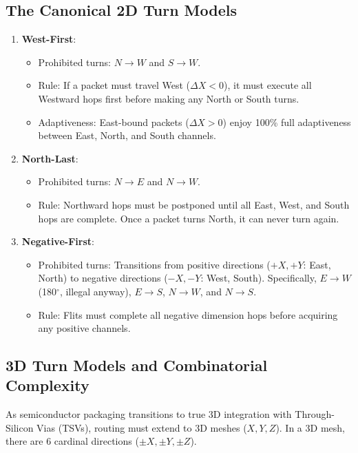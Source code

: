 \subsection{The Canonical 2D Turn Models}
\begin{enumerate}
    \item \textbf{West-First}:
    \begin{itemize}
        \item Prohibited turns: $N \to W$ and $S \to W$.
        \item Rule: If a packet must travel West ($\Delta X < 0$), it must execute all Westward hops first before making any North or South turns.
        \item Adaptiveness: East-bound packets ($\Delta X > 0$) enjoy 100\% full adaptiveness between East, North, and South channels.
    \end{itemize}
    \item \textbf{North-Last}:
    \begin{itemize}
        \item Prohibited turns: $N \to E$ and $N \to W$.
        \item Rule: Northward hops must be postponed until all East, West, and South hops are complete. Once a packet turns North, it can never turn again.
    \end{itemize}
    \item \textbf{Negative-First}:
    \begin{itemize}
        \item Prohibited turns: Transitions from positive directions ($+X, +Y$: East, North) to negative directions ($-X, -Y$: West, South). Specifically, $E \to W$ (180$^\circ$, illegal anyway), $E \to S$, $N \to W$, and $N \to S$.
        \item Rule: Flits must complete all negative dimension hops before acquiring any positive channels.
    \end{itemize}
\end{enumerate}

\subsection{3D Turn Models and Combinatorial Complexity}
\label{subsec:ch5_3d_turn}

As semiconductor packaging transitions to true 3D integration with Through-Silicon Vias (TSVs), routing must extend to 3D meshes ($X, Y, Z$). In a 3D mesh, there are 6 cardinal directions ($\pm X, \pm Y, \pm Z$).

